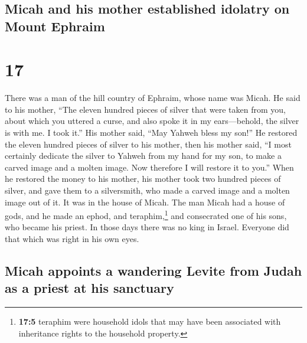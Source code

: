\hypertarget{micah-and-his-mother-established-idolatry-on-mount-ephraim}{%
\subsection{Micah and his mother established idolatry on Mount
Ephraim}\label{micah-and-his-mother-established-idolatry-on-mount-ephraim}}

\hypertarget{section-16}{%
\section{17}\label{section-16}}

 There was a man of the hill country of Ephraim, whose
name was Micah.  He said to his mother, ``The eleven
hundred pieces of silver that were taken from you, about which you
uttered a curse, and also spoke it in my ears---behold, the silver is
with me. I took it.'' His mother said, ``May Yahweh bless my son!''
 He restored the eleven hundred pieces of silver to his
mother, then his mother said, ``I most certainly dedicate the silver to
Yahweh from my hand for my son, to make a carved image and a molten
image. Now therefore I will restore it to you.''  When he
restored the money to his mother, his mother took two hundred pieces of
silver, and gave them to a silversmith, who made a carved image and a
molten image out of it. It was in the house of Micah.  The
man Micah had a house of gods, and he made an ephod, and
teraphim,\footnote{\textbf{17:5} teraphim were household idols that may
  have been associated with inheritance rights to the household
  property.} and consecrated one of his sons, who became his priest.
 In those days there was no king in Israel. Everyone did
that which was right in his own eyes.

\hypertarget{micah-appoints-a-wandering-levite-from-judah-as-a-priest-at-his-sanctuary}{%
\subsection{Micah appoints a wandering Levite from Judah as a priest at
his
sanctuary}\label{micah-appoints-a-wandering-levite-from-judah-as-a-priest-at-his-sanctuary}}

